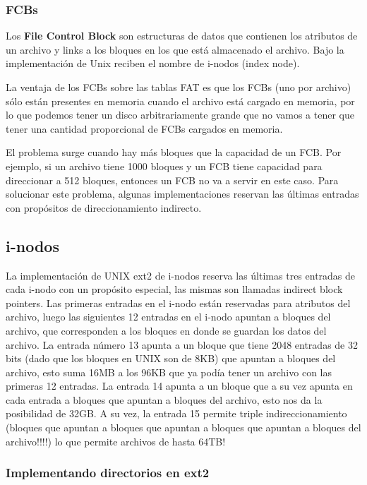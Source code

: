 \documentclass{article}
\begin{document}
\subsubsection{FCBs}

Los \textbf{File Control Block} son estructuras de datos que contienen los atributos de un archivo y links a los bloques en los que est\'a almacenado el archivo. Bajo la implementación de Unix reciben el nombre de i-nodos (index node).

La ventaja de los FCBs sobre las tablas FAT es que los FCBs (uno por archivo) s\'olo est\'an presentes en memoria cuando el archivo est\'a cargado en memoria, por lo que podemos tener un disco arbitrariamente grande que no vamos a tener que tener una cantidad proporcional de FCBs cargados en memoria.

El problema surge cuando hay m\'as bloques que la capacidad de un FCB. Por ejemplo, si un archivo tiene 1000 bloques y un FCB tiene capacidad para direccionar a 512 bloques, entonces un FCB no va a servir en este caso. Para solucionar este problema, algunas implementaciones reservan las \'ultimas entradas con propósitos de direccionamiento indirecto.

\subsection{i-nodos}

La implementaci\'on de UNIX ext2 de i-nodos reserva las últimas tres entradas de cada i-nodo con un propósito especial, las mismas son llamadas indirect block pointers. Las primeras entradas en el i-nodo están reservadas para atributos del archivo, luego las siguientes 12 entradas en el i-nodo apuntan a bloques del archivo, que corresponden a los bloques en donde se guardan los datos del archivo. La entrada n\'umero 13 apunta a un bloque que tiene 2048 entradas de 32 bits (dado que los bloques en UNIX son de 8KB) que apuntan a bloques del archivo, esto suma 16MB a los 96KB que ya pod\'ia tener un archivo con las primeras 12 entradas. La entrada 14 apunta a un bloque que a su vez apunta en cada entrada a bloques que apuntan a bloques del archivo, esto nos da la posibilidad de 32GB. A su vez, la entrada 15 permite triple indireccionamiento (bloques que apuntan a bloques que apuntan a bloques que apuntan a bloques del archivo!!!!) lo que permite archivos de hasta 64TB!

\subsubsection{Implementando directorios en ext2}
\end{document}
